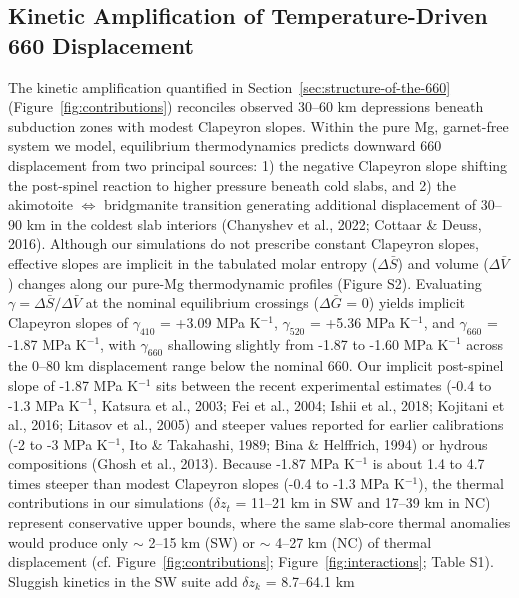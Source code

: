 \documentclass[draft,linenumbers]{agujournal2019}
\begin{document}
\subsection{Kinetic Amplification of Temperature-Driven 660
Displacement}\label{sec:kinetic-amplification-of-temperature-driven-660-displacement}

The kinetic amplification quantified in
Section~\ref{sec:structure-of-the-660} (Figure~\ref{fig:contributions})
reconciles observed 30--60 km depressions beneath subduction zones with
modest Clapeyron slopes. Within the pure Mg, garnet-free system we
model, equilibrium thermodynamics predicts downward 660 displacement
from two principal sources: 1) the negative Clapeyron slope shifting the
post-spinel reaction to higher pressure beneath cold slabs, and 2) the
akimotoite \(\Leftrightarrow\) bridgmanite transition generating
additional displacement of 30--90 km in the coldest slab interiors
({Chanyshev et al.}, 2022; Cottaar \& Deuss, 2016). Although our
simulations do not prescribe constant Clapeyron slopes, effective slopes
are implicit in the tabulated molar entropy (\(\Delta \bar{S}\)) and
volume (\(\Delta \bar{V}\)) changes along our pure-Mg thermodynamic
profiles (Figure S2). Evaluating
\(\gamma = \Delta \bar{S} / \Delta \bar{V}\) at the nominal equilibrium
crossings (\(\Delta \bar{G}\) = 0) yields implicit Clapeyron slopes of
\(\gamma_{410}\) = +3.09 MPa K\(^{-1}\), \(\gamma_{520}\) = +5.36 MPa
K\(^{-1}\), and \(\gamma_{660}\) = -1.87 MPa K\(^{-1}\), with
\(\gamma_{660}\) shallowing slightly from -1.87 to -1.60 MPa K\(^{-1}\)
across the 0--80 km displacement range below the nominal 660. Our
implicit post-spinel slope of -1.87 MPa K\(^{-1}\) sits between the
recent experimental estimates (-0.4 to -1.3 MPa K\(^{-1}\), {Katsura et
al.}, 2003; Fei et al., 2004; Ishii et al., 2018; Kojitani et al., 2016;
Litasov et al., 2005) and steeper values reported for earlier
calibrations (-2 to -3 MPa K\(^{-1}\), Ito \& Takahashi, 1989; Bina \&
Helffrich, 1994) or hydrous compositions (Ghosh et al., 2013). Because
-1.87 MPa K\(^{-1}\) is about 1.4 to 4.7 times steeper than modest
Clapeyron slopes (-0.4 to -1.3 MPa K\(^{-1}\)), the thermal
contributions in our simulations (\(\delta z_t\) = 11--21 km in SW and
17--39 km in NC) represent conservative upper bounds, where the same
slab-core thermal anomalies would produce only \(\sim\) 2--15 km (SW) or
\(\sim\) 4--27 km (NC) of thermal displacement (cf.
Figure~\ref{fig:contributions}; Figure~\ref{fig:interactions}; Table
S1). Sluggish kinetics in the SW suite add \(\delta z_k\) = 8.7--64.1 km
\end{document}
